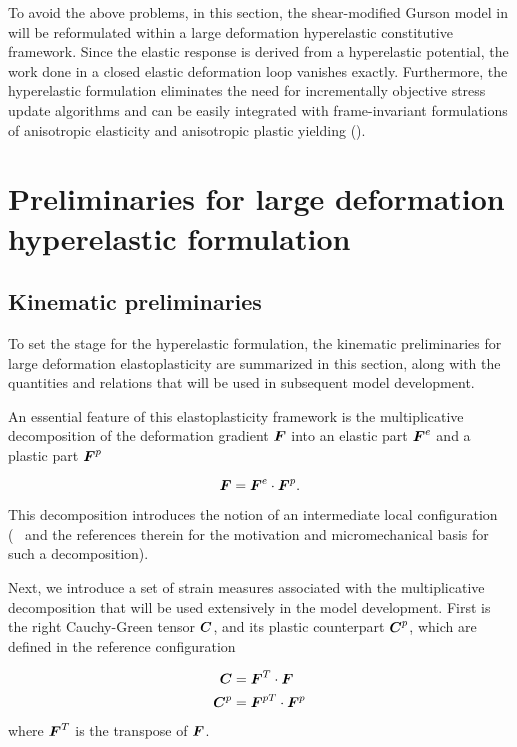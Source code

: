 To avoid the above problems, in this section, the shear-modified
Gurson model in \cite{Nahshon2008, Nahshon2009} will be reformulated
within a large deformation hyperelastic constitutive framework. Since
the elastic response is derived from a hyperelastic potential, the
work done in a closed elastic deformation loop vanishes
exactly. Furthermore, the hyperelastic formulation eliminates the need
for incrementally objective stress update algorithms and can be easily
integrated with frame-invariant formulations of anisotropic elasticity
and anisotropic plastic yielding (\cite{Belytschko2013}).

\section{Preliminaries for large deformation hyperelastic formulation}

\subsection{Kinematic preliminaries}
To set the stage for the hyperelastic formulation, the kinematic
preliminaries for large deformation elastoplasticity are summarized in
this section, along with the quantities and relations that will be
used in subsequent model development.

An essential feature of this elastoplasticity framework is the
multiplicative decomposition of the deformation gradient ${\boldsymbol{F}}$ into an
elastic part ${\boldsymbol{F}}^e$ and a plastic part ${\boldsymbol{F}}^p$

\begin{equation}
  {\boldsymbol{F}} = {\boldsymbol{F}}^e \cdot {\boldsymbol{F}}^p.
\end{equation}

This decomposition introduces the notion of an intermediate local
configuration (\cf\ \cite{SimoHughes:98} and the references therein
for the motivation and micromechanical basis for such a
decomposition).

Next, we introduce a set of strain measures associated with the
multiplicative decomposition that will be used extensively in the
model development. First is the right Cauchy-Green tensor ${\boldsymbol{C}}$, and
its plastic counterpart ${\boldsymbol{C}}^p$, which are defined in the reference
configuration

\begin{align}
  {\boldsymbol{C}} &= {\boldsymbol{F}}^T \cdot {\boldsymbol{F}}\\ {\boldsymbol{C}}^p &= {\boldsymbol{F}}^{pT} \cdot {\boldsymbol{F}}^p
\end{align}
where ${\boldsymbol{F}}^T$ is the transpose of ${\boldsymbol{F}}$.

